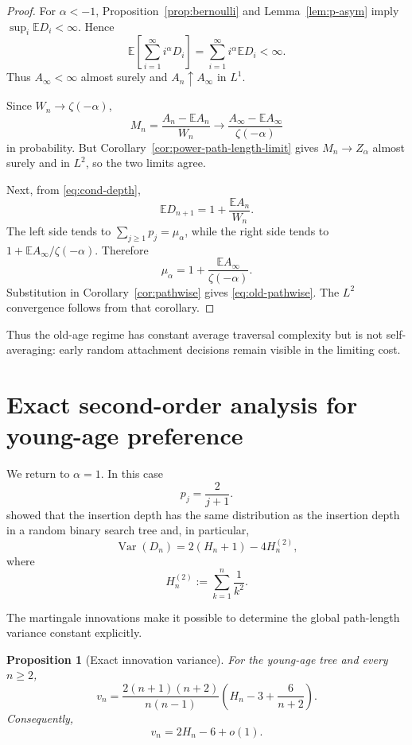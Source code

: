 \documentclass[11pt,a4paper]{article}
\newtheorem{proposition}[theorem]{Proposition}
\newcommand{\E}{\mathbb{E}}
\newcommand{\Var}{\operatorname{Var}}
\newcommand{\1}{\mathbf{1}}
\begin{document}
\begin{proof}
For $\alpha<-1$, Proposition~\ref{prop:bernoulli} and
Lemma~\ref{lem:p-asym} imply $\sup_i\E D_i<\infty$.  Hence
\[
\E\left[\sum_{i=1}^\infty i^\alpha D_i\right]
=
\sum_{i=1}^\infty i^\alpha\E D_i
<\infty.
\]
Thus $A_\infty<\infty$ almost surely and $A_n\uparrow A_\infty$ in $L^1$.

Since $W_n\to\zeta(-\alpha)$,
\[
M_n
=
\frac{A_n-\E A_n}{W_n}
\longrightarrow
\frac{A_\infty-\E A_\infty}{\zeta(-\alpha)}
\]
in probability.  But Corollary~\ref{cor:power-path-length-limit} gives
$M_n\to Z_\alpha$ almost surely and in $L^2$, so the two limits agree.

Next, from \eqref{eq:cond-depth},
\[
\E D_{n+1}
=
1+\frac{\E A_n}{W_n}.
\]
The left side tends to
$\sum_{j\ge1}p_j=\mu_\alpha$, while the right side tends to
$1+\E A_\infty/\zeta(-\alpha)$.  Therefore
\[
\mu_\alpha
=
1+\frac{\E A_\infty}{\zeta(-\alpha)}.
\]
Substitution in Corollary~\ref{cor:pathwise} gives
\eqref{eq:old-pathwise}.  The $L^2$ convergence follows from that corollary.
\end{proof}

Thus the old-age regime has constant average traversal complexity but is not
self-averaging: early random attachment decisions remain visible in the
limiting cost.

\section{Exact second-order analysis for young-age preference}
\label{sec:youngage}

We return to $\alpha=1$.  In this case
\[
p_j=\frac{2}{j+1}.
\]
\citet{LyonMahmoud2020} showed that the insertion depth has the same
distribution as the insertion depth in a random binary search tree and, in
particular,
\begin{equation}\label{eq:young-depth-var}
\Var(D_n)
=
2(H_n+1)-4H_n^{(2)},
\end{equation}
where
\[
H_n^{(2)}:=\sum_{k=1}^n\frac1{k^2}.
\]

The martingale innovations make it possible to determine the global
path-length variance constant explicitly.

\begin{proposition}[Exact innovation variance]\label{prop:young-v}
For the young-age tree and every $n\ge2$,
\begin{equation}\label{eq:young-v}
v_n
=
\frac{2(n+1)(n+2)}{n(n-1)}
\left(
H_n-3+\frac6{n+2}
\right).
\end{equation}
Consequently,
\[
v_n=2H_n-6+o(1).
\]
\end{proposition}
\end{document}
